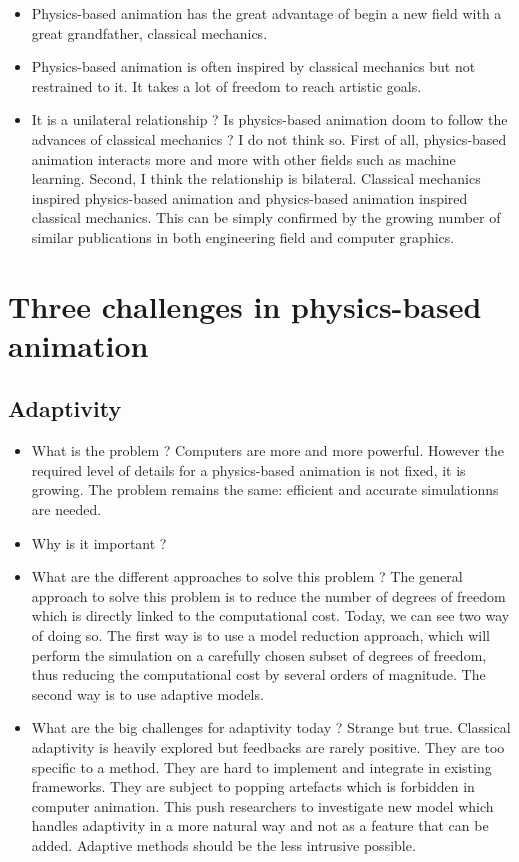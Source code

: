 \begin{itemize}
    \item Physics-based animation has the great advantage of begin a new field with a great grandfather, classical mechanics.
    \item Physics-based animation is often inspired by classical mechanics but not restrained to it. It takes a lot of freedom to reach artistic goals.
    \item It is a unilateral relationship ? Is physics-based animation doom to follow the advances of classical mechanics ? I do not think so. First of all, physics-based animation interacts more and more with other fields such as machine learning. Second, I think the relationship is bilateral. Classical mechanics inspired physics-based animation and physics-based animation inspired classical mechanics. This can be simply confirmed by the growing number of similar publications in both engineering field and computer graphics.
\end{itemize}

\section{Three challenges in physics-based animation}

\subsection{Adaptivity}
\begin{itemize}
            \item What is the problem ? Computers are more and more powerful. However the required level of details for a physics-based animation is not fixed, it is growing. The problem remains the same: efficient and accurate simulationns are needed. 
            \item Why is it important ?
            \item What are the different approaches to solve this problem ? The general approach to solve this problem is to reduce the number of degrees of freedom which is directly linked to the computational cost. Today, we can see two way of doing so. The first way is to use a model reduction approach, which will perform the simulation on a carefully chosen subset of degrees of freedom, thus reducing the computational cost by several orders of magnitude. The second way is to use adaptive models. 
            \item What are the big challenges for adaptivity today ? Strange but true. Classical adaptivity is heavily explored but feedbacks are rarely positive. They are too specific to a method. They are hard to implement and integrate in existing frameworks. They are subject to popping artefacts which is forbidden in computer animation. This push researchers to investigate new model which handles adaptivity in a more natural way and not as a feature that can be added. Adaptive methods should be the less intrusive possible.
\end{itemize}

